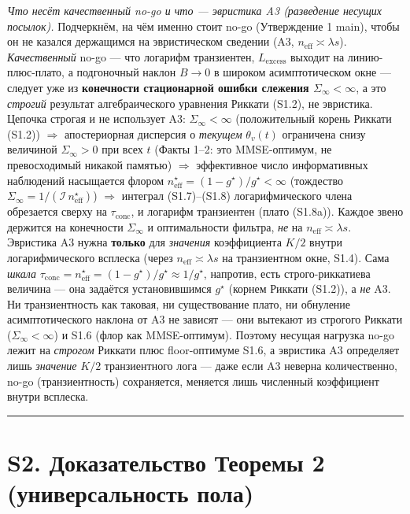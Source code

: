 \documentclass[12pt]{iopart}
\begin{document}
\emph{Что несёт качественный no-go и что --- эвристика A3 (разведение несущих посылок).} Подчеркнём, на чём именно стоит no-go (Утверждение 1 main), чтобы он не казался держащимся на эвристическом сведении (A3, \(n_{\text{eff}} \asymp \lambda s\)). \emph{Качественный} no-go --- что логарифм транзиентен, \(L_{\text{excess}}\) выходит на линию-плюс-плато, а подгоночный наклон \(B \to 0\) в широком асимптотическом окне --- следует уже из \textbf{конечности стационарной ошибки слежения \(\Sigma_\infty < \infty\)}, а это \emph{строгий} результат алгебраического уравнения Риккати (S1.2), не эвристика. Цепочка строгая и не использует A3: \(\Sigma_\infty < \infty\) (положительный корень Риккати (S1.2)) \(\Rightarrow\) апостериорная дисперсия о \emph{текущем} \(\theta_v(t)\) ограничена снизу величиной \(\Sigma_\infty > 0\) при всех \(t\) (Факты 1--2: это MMSE-оптимум, не превосходимый никакой памятью) \(\Rightarrow\) эффективное число информативных наблюдений насыщается флором \(n_{\text{eff}}^\star = (1-g^\star)/g^\star < \infty\) (тождество \(\Sigma_\infty = 1/(\mathcal I\,n_{\text{eff}}^\star)\)) \(\Rightarrow\) интеграл (S1.7)--(S1.8) логарифмического члена обрезается сверху на \(\tau_{\text{conc}}\), и логарифм транзиентен (плато (S1.8a)). Каждое звено держится на конечности \(\Sigma_\infty\) и оптимальности фильтра, \emph{не} на \(n_{\text{eff}} \asymp \lambda s\). Эвристика A3 нужна \textbf{только} для \emph{значения} коэффициента \(K/2\) внутри логарифмического всплеска (через \(n_{\text{eff}} \asymp \lambda s\) на транзиентном окне, S1.4). Сама \emph{шкала} \(\tau_{\text{conc}} = n_{\text{eff}}^\star = (1-g^\star)/g^\star \approx 1/g^\star\), напротив, есть строго-риккатиева величина --- она задаётся установившимся \(g^\star\) (корнем Риккати (S1.2)), а \emph{не} A3. Ни транзиентность как таковая, ни существование плато, ни обнуление асимптотического наклона от A3 не зависят --- они вытекают из строгого Риккати (\(\Sigma_\infty < \infty\)) и S1.6 (флор как MMSE-оптимум). Поэтому несущая нагрузка no-go лежит на \emph{строгом} Риккати плюс floor-оптимуме S1.6, а эвристика A3 определяет лишь \emph{значение} \(K/2\) транзиентного лога --- даже если A3 неверна количественно, no-go (транзиентность) сохраняется, меняется лишь численный коэффициент внутри всплеска.



\begin{center}\rule{0.5\linewidth}{0.5pt}\end{center}



\section{S2. Доказательство Теоремы 2 (универсальность пола)}\label{s2.-ux434ux43eux43aux430ux437ux430ux442ux435ux43bux44cux441ux442ux432ux43e-ux442ux435ux43eux440ux435ux43cux44b-2-ux443ux43dux438ux432ux435ux440ux441ux430ux43bux44cux43dux43eux441ux442ux44c-ux43fux43eux43bux430}
\end{document}
